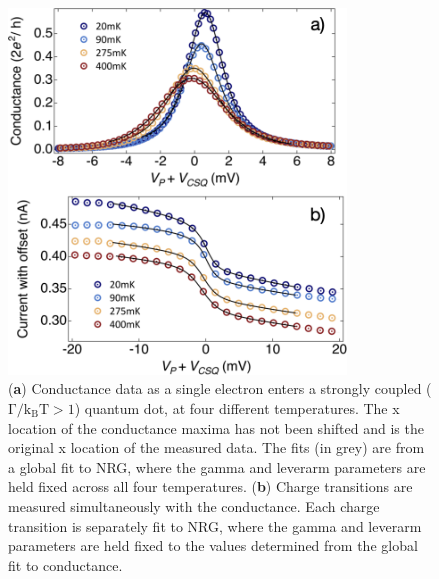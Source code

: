 \begin{figure}[!bht]
 \begin{center}
 \includegraphics[width=0.8\textwidth]{figures/ch3/crop_FiguresMaster.013.png}
 \caption[Method to determine gamma and leverarm and fit to charge transitions]{\label{fig:ch3/cond_ct_gf} 
 (\textbf{a}) Conductance data as a single electron enters a strongly coupled ($\mathrm{\Gamma/k_BT > 1}$) quantum dot, at four different temperatures. The x location of the conductance maxima has not been shifted and is the original x location of the measured data. The fits (in grey) are from a global fit to NRG, where the gamma and leverarm parameters are held fixed across all four temperatures. (\textbf{b}) Charge transitions are measured simultaneously with the conductance. Each charge transition is separately fit to NRG, where the gamma and leverarm parameters are held fixed to the values determined from the global fit to conductance.}
 \end{center}
\end{figure}

